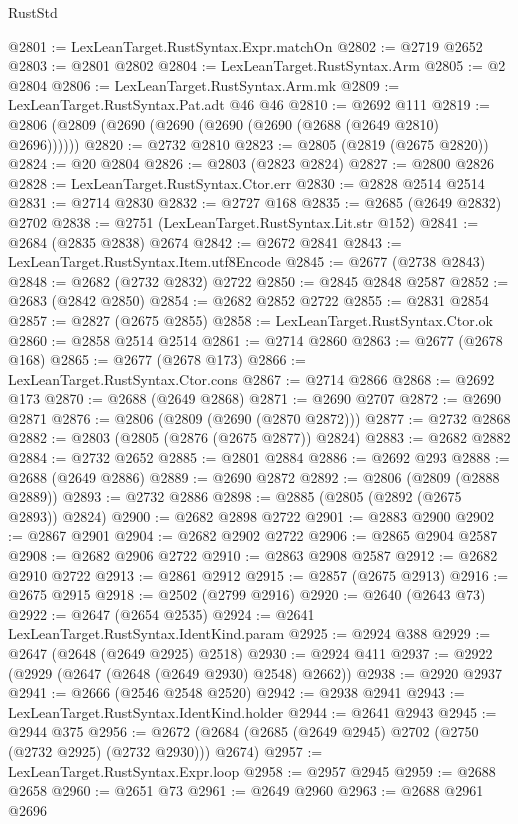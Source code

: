 \begin{lexlean}{RustStd}
\begin{coremodule}
{\begin{coremodule}
{{{{{{{{{{{{{{{{{{{{{{{{{{@2801 := LexLeanTarget.RustSyntax.Expr.matchOn
@2802 := @2719 @2652
@2803 := @2801 @2802
@2804 := LexLeanTarget.RustSyntax.Arm
@2805 := @2 @2804
@2806 := LexLeanTarget.RustSyntax.Arm.mk
@2809 := LexLeanTarget.RustSyntax.Pat.adt @46 @46
@2810 := @2692 @111
@2819 := @2806 (@2809 (@2690 (@2690 (@2690 (@2690 (@2688 (@2649 @2810) @2696))))))
@2820 := @2732 @2810
@2823 := @2805 (@2819 (@2675 @2820))
@2824 := @20 @2804
@2826 := @2803 (@2823 @2824)
@2827 := @2800 @2826
@2828 := LexLeanTarget.RustSyntax.Ctor.err
@2830 := @2828 @2514 @2514
@2831 := @2714 @2830
@2832 := @2727 @168
@2835 := @2685 (@2649 @2832) @2702
@2838 := @2751 (LexLeanTarget.RustSyntax.Lit.str @152)
@2841 := @2684 (@2835 @2838) @2674
@2842 := @2672 @2841
@2843 := LexLeanTarget.RustSyntax.Item.utf8Encode
@2845 := @2677 (@2738 @2843)
@2848 := @2682 (@2732 @2832) @2722
@2850 := @2845 @2848 @2587
@2852 := @2683 (@2842 @2850)
@2854 := @2682 @2852 @2722
@2855 := @2831 @2854
@2857 := @2827 (@2675 @2855)
@2858 := LexLeanTarget.RustSyntax.Ctor.ok
@2860 := @2858 @2514 @2514
@2861 := @2714 @2860
@2863 := @2677 (@2678 @168)
@2865 := @2677 (@2678 @173)
@2866 := LexLeanTarget.RustSyntax.Ctor.cons
@2867 := @2714 @2866
@2868 := @2692 @173
@2870 := @2688 (@2649 @2868)
@2871 := @2690 @2707
@2872 := @2690 @2871
@2876 := @2806 (@2809 (@2690 (@2870 @2872)))
@2877 := @2732 @2868
@2882 := @2803 (@2805 (@2876 (@2675 @2877)) @2824)
@2883 := @2682 @2882
@2884 := @2732 @2652
@2885 := @2801 @2884
@2886 := @2692 @293
@2888 := @2688 (@2649 @2886)
@2889 := @2690 @2872
@2892 := @2806 (@2809 (@2888 @2889))
@2893 := @2732 @2886
@2898 := @2885 (@2805 (@2892 (@2675 @2893)) @2824)
@2900 := @2682 @2898 @2722
@2901 := @2883 @2900
@2902 := @2867 @2901
@2904 := @2682 @2902 @2722
@2906 := @2865 @2904 @2587
@2908 := @2682 @2906 @2722
@2910 := @2863 @2908 @2587
@2912 := @2682 @2910 @2722
@2913 := @2861 @2912
@2915 := @2857 (@2675 @2913)
@2916 := @2675 @2915
@2918 := @2502 (@2799 @2916)
@2920 := @2640 (@2643 @73)
@2922 := @2647 (@2654 @2535)
@2924 := @2641 LexLeanTarget.RustSyntax.IdentKind.param
@2925 := @2924 @388
@2929 := @2647 (@2648 (@2649 @2925) @2518)
@2930 := @2924 @411
@2937 := @2922 (@2929 (@2647 (@2648 (@2649 @2930) @2548) @2662))
@2938 := @2920 @2937
@2941 := @2666 (@2546 @2548 @2520)
@2942 := @2938 @2941
@2943 := LexLeanTarget.RustSyntax.IdentKind.holder
@2944 := @2641 @2943
@2945 := @2944 @375
@2956 := @2672 (@2684 (@2685 (@2649 @2945) @2702 (@2750 (@2732 @2925) (@2732 @2930))) @2674)
@2957 := LexLeanTarget.RustSyntax.Expr.loop
@2958 := @2957 @2945
@2959 := @2688 @2658
@2960 := @2651 @73
@2961 := @2649 @2960
@2963 := @2688 @2961 @2696
}}}}}}}}}}}}}}}}}}}}}}}}}}
\end{coremodule}}
\end{coremodule}
\end{lexlean}
